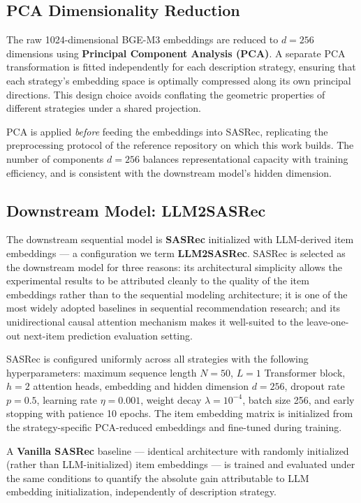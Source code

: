 \documentclass[12pt,a4paper]{report}
\newcommand{\parencite}[1]{\citep{#1}}
\begin{document}
\subsection{PCA Dimensionality Reduction}

The raw 1024-dimensional BGE-M3 embeddings are reduced to
$d = 256$ dimensions using \textbf{Principal Component Analysis
(PCA)}. A separate PCA transformation is fitted independently
for each description strategy, ensuring that each strategy's
embedding space is optimally compressed along its own principal
directions. This design choice avoids conflating the geometric
properties of different strategies under a shared projection.

PCA is applied \textit{before} feeding the embeddings into
SASRec, replicating the preprocessing protocol of the reference
repository on which this work builds. The number of components
$d = 256$ balances representational capacity with training
efficiency, and is consistent with the downstream model's
hidden dimension.

\subsection{Downstream Model: LLM2SASRec}

The downstream sequential model is \textbf{SASRec}
\parencite{kang2018self} initialized with LLM-derived item
embeddings --- a configuration we term \textbf{LLM2SASRec}.
SASRec is selected as the downstream model for three reasons:
its architectural simplicity allows the experimental results
to be attributed cleanly to the quality of the item embeddings
rather than to the sequential modeling architecture; it is one
of the most widely adopted baselines in sequential recommendation
research; and its unidirectional causal attention mechanism
makes it well-suited to the leave-one-out next-item prediction
evaluation setting.

SASRec is configured uniformly across all strategies with
the following hyperparameters: maximum sequence length $N = 50$,
$L = 1$ Transformer block, $h = 2$ attention heads, embedding
and hidden dimension $d = 256$, dropout rate $p = 0.5$,
learning rate $\eta = 0.001$, weight decay $\lambda = 10^{-4}$,
batch size 256, and early stopping with patience 10 epochs.
The item embedding matrix is initialized from the
strategy-specific PCA-reduced embeddings and fine-tuned during
training.

A \textbf{Vanilla SASRec} baseline --- identical architecture
with randomly initialized (rather than LLM-initialized)
item embeddings --- is trained and evaluated under the same
conditions to quantify the absolute gain attributable to
LLM embedding initialization, independently of description
strategy.
\end{document}
